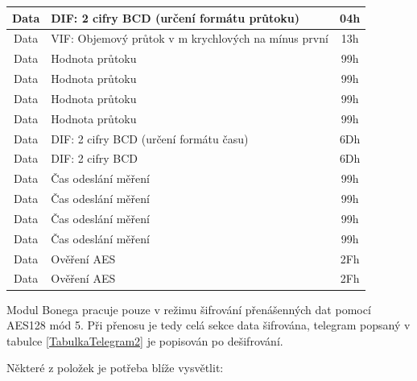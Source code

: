 \begin{table}[!ht]
{\begin{tabular}{|c|l|c|}
Data               & DIF: 2 cifry BCD (určení formátu průtoku)      & 04h              \\ \hline
Data               & VIF: Objemový průtok v m krychlových na mínus první & 13h         \\ \hline
Data               & Hodnota průtoku                               & 99h               \\ \hline
Data               & Hodnota průtoku                               & 99h               \\ \hline
Data               & Hodnota průtoku                               & 99h               \\ \hline
Data               & Hodnota průtoku                               & 99h               \\ \hline
Data               & DIF: 2 cifry BCD (určení formátu času)         & 6Dh              \\ \hline
Data               & DIF: 2 cifry BCD                               & 6Dh              \\ \hline
Data               & Čas odeslání měření                           & 99h               \\ \hline
Data               & Čas odeslání měření                           & 99h               \\ \hline
Data               & Čas odeslání měření                           & 99h               \\ \hline
Data               & Čas odeslání měření                           & 99h               \\ \hline	
Data						   & Ověření AES                                    & 2Fh              \\ \hline
Data						   & Ověření AES                                    & 2Fh              \\ \hline

\end{tabular}}
\end{table}

\newpage{}

Modul Bonega pracuje pouze v režimu šifrování přenášenných dat pomocí AES128 mód 5. Při přenosu je tedy celá sekce data šifrována, telegram popsaný v tabulce \ref{TabulkaTelegram2} je popisován po dešifrování.

Některé z položek je potřeba blíže vysvětlit:

